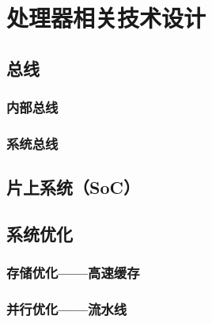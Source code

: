 

\chapter{处理器相关技术设计}

\section{总线}

\subsection{内部总线}

\subsection{系统总线}

\section{片上系统（SoC）}

\section{系统优化}

\subsection{存储优化——高速缓存}

\subsection{并行优化——流水线}